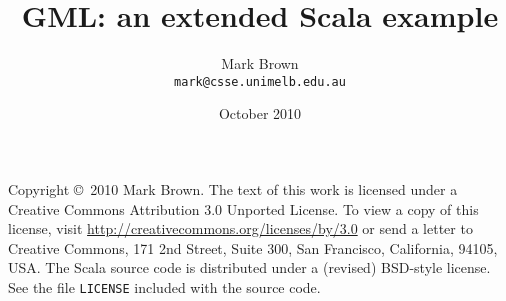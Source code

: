 \documentclass{article}
\title{GML: an extended Scala example}
\author{Mark Brown \\ \texttt{mark@csse.unimelb.edu.au}}
\date{October 2010}
\begin{document}
\maketitle

\tableofcontents
\listoffigures

\vspace{3ex}
Copyright \copyright\ 2010 Mark Brown.
The text of this work is licensed under a
Creative Commons Attribution 3.0 Unported License.
To view a copy of this license, visit
\url{http://creativecommons.org/licenses/by/3.0}
or send a letter to Creative Commons,
171 2nd Street, Suite 300, San Francisco, California, 94105, USA.
The Scala source code is distributed under a (revised) BSD-style license.
See the file \verb!LICENSE! included with the source code.



\appendix


\end{document}
